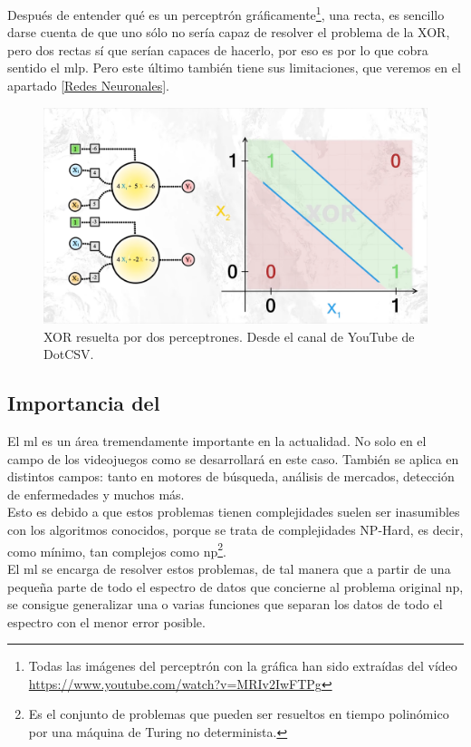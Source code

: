 Después de entender qué es un perceptrón gráficamente\footnote{Todas las imágenes del perceptrón con la gráfica han sido extraídas del vídeo \url{https://www.youtube.com/watch?v=MRIv2IwFTPg}}, una recta, es sencillo darse cuenta de que uno sólo no sería capaz de resolver el problema de la XOR, pero dos rectas sí que serían capaces de hacerlo, por eso es por lo que cobra sentido el \gls{mlp}. Pero este último también tiene sus limitaciones, que veremos en el apartado \ref{Redes Neuronales}.

\begin{figure}[h]
	\centering
	\includegraphics[width=15cm]{archivos/imagenes/problema-xor-resuelto.png}
	\caption{XOR resuelta por dos perceptrones. Desde el canal de YouTube de DotCSV.}
\end{figure}

\subsection{Importancia del }
\label{importancia ml}
El \gls{ml} es un área tremendamente importante en la actualidad. No solo en el campo de los videojuegos como se desarrollará en este caso. También se aplica en distintos campos: tanto en motores de búsqueda, análisis de mercados, detección de enfermedades y muchos más. 
\\
Esto es debido a que estos problemas tienen complejidades suelen ser inasumibles con los algoritmos conocidos, porque se trata de complejidades NP-Hard, es decir, como mínimo, tan complejos como \gls{np}\footnote{Es el conjunto de problemas que pueden ser resueltos en tiempo polinómico por una máquina de Turing no determinista.}. 
\\
El \gls{ml} se encarga de resolver estos problemas, de tal manera que a partir de una pequeña parte de todo el espectro de datos que concierne al problema original \gls{np}, se consigue generalizar una o varias funciones que separan los datos de todo el espectro con el menor error posible.

